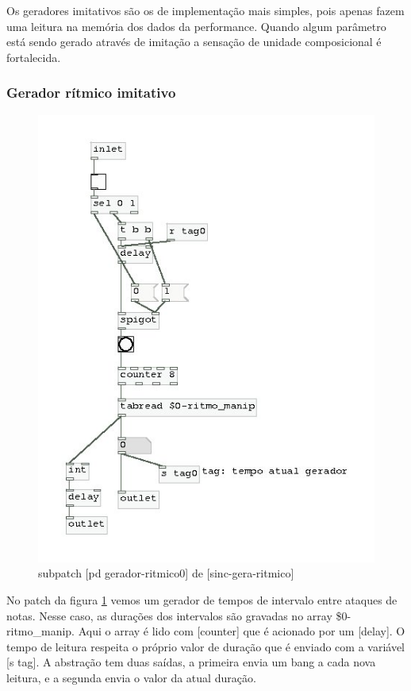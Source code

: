\documentclass{ppgmus}
\begin{document}
Os geradores imitativos são os de implementação mais
simples, pois apenas fazem uma leitura na memória dos dados
da performance.
Quando algum parâmetro está sendo gerado através de imitação
a sensação de unidade composicional é fortalecida.



\subsubsection{Gerador rítmico imitativo}



\begin{figure}
\includegraphics[scale=.6]{gerador-ritmico0}
\caption{subpatch [pd gerador-ritmico0] de [sinc-gera-ritmico]}
\label{gera-ritmico0}
\end{figure}   


No patch da figura \ref{gera-ritmico0} vemos um gerador de tempos
de intervalo entre ataques de notas. Nesse caso, as durações dos intervalos
são gravadas no array \$0-ritmo\_manip. Aqui o array é lido com
[counter] que é acionado por um [delay]. O tempo de leitura respeita
o próprio valor de duração que é enviado com a variável [s tag].
A abstração tem duas saídas, a primeira envia um bang a cada nova 
leitura, e a segunda envia o valor da atual duração.
\end{document}
